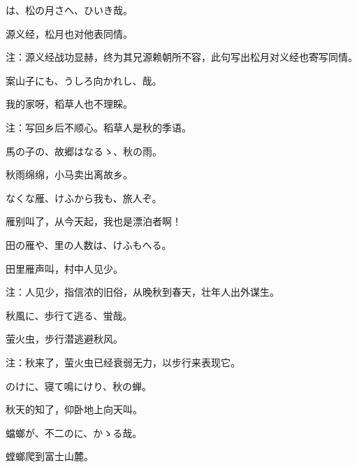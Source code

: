 \begin{haiku}
    {\FH {}は、松の月さへ、ひいき哉。}

    {\FK 源义经，松月也对他表同情。}

    {\FT 注：源义经战功显赫，终为其兄源赖朝所不容，此句写出松月对义经也寄写同情。}
\end{haiku}

\begin{haiku}
    {\FH 案山子にも、うしろ向かれし、哉。}

    {\FK 我的家呀，稻草人也不理睬。}

    {\FT 注：写回乡后不顺心。稻草人是秋的季语。}
\end{haiku}

\begin{haiku}
    {\FH 馬の子の、故郷はなるゝ、秋の雨。}

    {\FK 秋雨绵绵，小马卖出离故乡。}
\end{haiku}

\begin{haiku}
    {\FH なくな雁、けふから我も、旅人ぞ。}

    {\FK 雁别叫了，从今天起，我也是漂泊者啊！}
\end{haiku}

\begin{haiku}
    {\FH 田の雁や、里の人数は、けふもへる。}

    {\FK 田里雁声叫，村中人见少。}

    {\FT 注：人见少，指信浓的旧俗，从晚秋到春天，壮年人出外谋生。}
\end{haiku}

\begin{haiku}
    {\FH 秋風に、歩行て逃る、蛍哉。}

    {\FK 萤火虫，步行潜逃避秋风。}

    {\FT 注：秋来了，萤火虫已经衰弱无力，以步行来表现它。}
\end{haiku}

\begin{haiku}
    {\FH {}のけに、寝て鳴にけり、秋の蝉。}

    {\FK 秋天的知了，仰卧地上向天叫。}
\end{haiku}

\begin{haiku}
    {\FH 蟷螂が、不二のに、かゝる哉。}

    {\FK 螳螂爬到富士山麓。}
\end{haiku}

